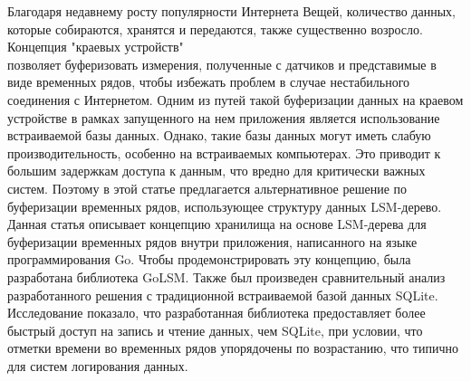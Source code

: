 Благодаря недавнему росту популярности Интернета Вещей, количество данных, которые собираются, хранятся и передаются, также существенно возросло. Концепция "краевых устройств"\\
позволяет буферизовать измерения, полученные с датчиков и представимые в виде временных рядов, чтобы избежать проблем в случае нестабильного соединения с Интернетом.
Одним из путей такой буферизации данных на краевом устройстве в рамках запущенного на нем приложения является использование встраиваемой базы данных. Однако, такие базы данных могут иметь слабую производительность, особенно на встраиваемых компьютерах. Это приводит к большим задержкам доступа к данным, что вредно для критически важных систем. Поэтому в этой статье предлагается альтернативное решение по буферизации временных рядов, использующее структуру данных LSM-дерево.
Данная статья описывает концепцию хранилища на основе LSM-дерева для буферизации временных рядов внутри приложения, написанного на языке программирования Go. Чтобы продемонстрировать эту концепцию, была разработана библиотека GoLSM. Также был произведен сравнительный анализ разработанного решения с традиционной встраиваемой базой данных SQLite. Исследование показало, что разработанная библиотека предоставляет более быстрый доступ на запись и чтение данных, чем SQLite, при условии, что отметки времени во временных рядов упорядочены по возрастанию, что типично для систем логирования данных.
